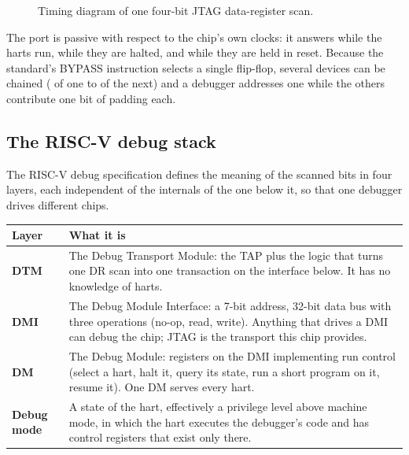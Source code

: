 \begin{figure}[htpb]
	\centering
	
	\caption{Timing diagram of one four-bit JTAG data-register scan.}
	\label{fig:jtag-scan}
\end{figure}

The port is passive with respect to the chip's own clocks: it answers while the harts run, while they are halted, and while they are held in reset. Because the standard's BYPASS instruction selects a single flip-flop, several devices can be chained ( of one to  of the next) and a debugger addresses one while the others contribute one bit of padding each.

\subsection{The RISC-V debug stack} \label{ss:debug-stack}

The RISC-V debug specification defines the meaning of the scanned bits in four layers, each independent of the internals of the one below it, so that one debugger drives different chips.

\begin{center}
\begin{tabular}{ l p{11.0cm} }
	\textbf{Layer} & \textbf{What it is} \\ \hline
	\textbf{DTM} & The Debug Transport Module: the TAP plus the logic that turns one DR scan into one transaction on the interface below. It has no knowledge of harts. \\
	\rowcolor{tablehighlightcolor} \textbf{DMI} & The Debug Module Interface: a 7-bit address, 32-bit data bus with three operations (no-op, read, write). Anything that drives a DMI can debug the chip; JTAG is the transport this chip provides. \\
	\textbf{DM} & The Debug Module: registers on the DMI implementing run control (select a hart, halt it, query its state, run a short program on it, resume it). One DM serves every hart. \\
	\rowcolor{tablehighlightcolor} \textbf{Debug mode} & A state of the hart, effectively a privilege level above machine mode, in which the hart executes the debugger's code and has control registers that exist only there. \\ \hline
\end{tabular}
\end{center}

